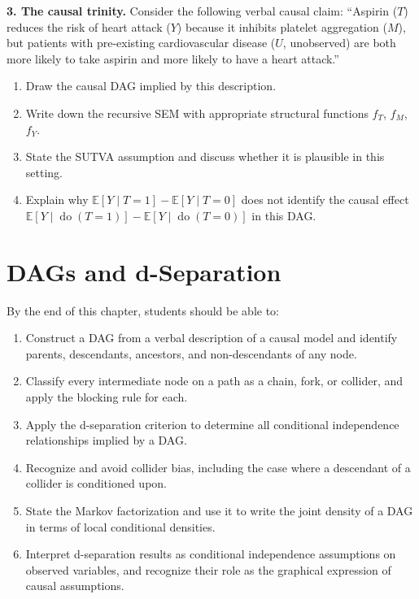 \documentclass[
  a4paper,
]{book}
\providecommand{\tightlist}{%
  \setlength{\itemsep}{0pt}\setlength{\parskip}{0pt}}
\newcommand{\doop}{\operatorname{do}}
\newcommand{\E}{\mathbb{E}}
\begin{document}
\textbf{3. The causal trinity.} Consider the following verbal causal
claim: ``Aspirin (\(T\)) reduces the risk of heart attack (\(Y\))
because it inhibits platelet aggregation (\(M\)), but patients with
pre-existing cardiovascular disease (\(U\), unobserved) are both more
likely to take aspirin and more likely to have a heart attack.''

\begin{enumerate}
\def\labelenumi{(\alph{enumi})}
\tightlist
\item
  Draw the causal DAG implied by this description.
\item
  Write down the recursive SEM with appropriate structural functions
  \(f_T\), \(f_M\), \(f_Y\).
\item
  State the SUTVA assumption and discuss whether it is plausible in this
  setting.
\item
  Explain why \(\E[Y \mid T{=}1] - \E[Y \mid T{=}0]\) does not identify
  the causal effect
  \(\E[Y \mid \doop(T{=}1)] - \E[Y \mid \doop(T{=}0)]\) in this DAG.
\end{enumerate}


\chapter{DAGs and d-Separation}\label{dags-and-d-separation}

\begin{tcolorbox}[enhanced jigsaw, arc=.35mm, bottomrule=.15mm, bottomtitle=1mm, breakable, colback=white, colbacktitle=quarto-callout-note-color!10!white, colframe=quarto-callout-note-color-frame, coltitle=black, left=2mm, leftrule=.75mm, opacityback=0, opacitybacktitle=0.6, rightrule=.15mm, title={Learning Objectives}, titlerule=0mm, toprule=.15mm, toptitle=1mm]

By the end of this chapter, students should be able to:

\begin{enumerate}
\def\labelenumi{\arabic{enumi}.}
\tightlist
\item
  Construct a DAG from a verbal description of a causal model and
  identify parents, descendants, ancestors, and non-descendants of any
  node.
\item
  Classify every intermediate node on a path as a chain, fork, or
  collider, and apply the blocking rule for each.
\item
  Apply the d-separation criterion to determine all conditional
  independence relationships implied by a DAG.
\item
  Recognize and avoid collider bias, including the case where a
  descendant of a collider is conditioned upon.
\item
  State the Markov factorization and use it to write the joint density
  of a DAG in terms of local conditional densities.
\item
  Interpret d-separation results as conditional independence assumptions
  on observed variables, and recognize their role as the graphical
  expression of causal assumptions.
\end{enumerate}

\end{tcolorbox}
\end{document}
